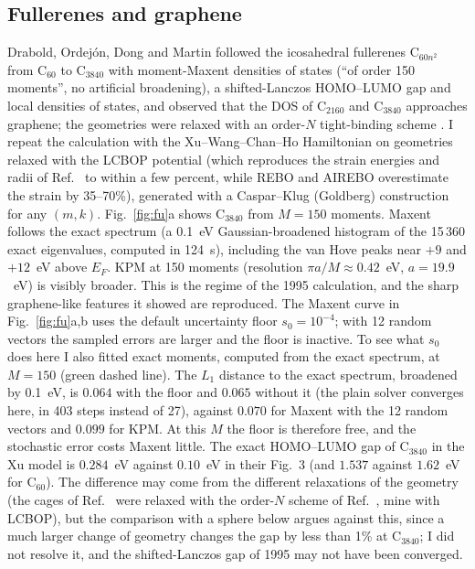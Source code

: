 \documentclass[reprint,nofootinbib,superscriptaddress,amsmath,amssymb,aps,prb,floatfix]{revtex4-2}
\begin{document}
\subsection{Fullerenes and graphene}
\label{sec:app_fu}

Drabold, Ordej\'on, Dong and Martin \cite{ssc96} followed the icosahedral fullerenes C$_{60n^2}$ from C$_{60}$ to C$_{3840}$ with moment-Maxent densities of states (``of order 150 moments'', no artificial broadening), a shifted-Lanczos HOMO--LUMO gap and local densities of states, and observed that the DOS of C$_{2160}$ and C$_{3840}$ approaches graphene; the geometries were relaxed with an order-$N$ tight-binding scheme \cite{itoh}.
I repeat the calculation with the Xu--Wang--Chan--Ho Hamiltonian \cite{xu} on geometries relaxed with the LCBOP potential \cite{lcbop} (which reproduces the strain energies and radii of Ref.~\cite{itoh} to within a few percent, while REBO and AIREBO overestimate the strain by 35--70\%), generated with a Caspar--Klug (Goldberg) construction for any $(m,k)$.
Fig.~\ref{fig:fu}a shows C$_{3840}$ from $M=150$ moments. Maxent follows the exact spectrum (a 0.1~eV Gaussian-broadened histogram of the 15\,360 exact eigenvalues, computed in 124~s), including the van Hove peaks near $+9$ and $+12$~eV above $E_F$. KPM at 150 moments (resolution $\pi a/M\approx0.42$~eV, $a=19.9$~eV) is visibly broader. This is the regime of the 1995 calculation, and the sharp graphene-like features it showed are reproduced.
The Maxent curve in Fig.~\ref{fig:fu}a,b uses the default uncertainty floor $s_0=10^{-4}$; with 12 random vectors the sampled errors are larger and the floor is inactive. To see what $s_0$ does here I also fitted exact moments, computed from the exact spectrum, at $M=150$ (green dashed line). The $L_1$ distance to the exact spectrum, broadened by 0.1~eV, is $0.064$ with the floor and $0.065$ without it (the plain solver converges here, in 403 steps instead of 27), against $0.070$ for Maxent with the 12 random vectors and $0.099$ for KPM. At this $M$ the floor is therefore free, and the stochastic error costs Maxent little.
The exact HOMO--LUMO gap of C$_{3840}$ in the Xu model is $0.284$~eV against $0.10$~eV in their Fig.~3 (and $1.537$ against $1.62$~eV for C$_{60}$). The difference may come from the different relaxations of the geometry (the cages of Ref.~\cite{ssc96} were relaxed with the order-$N$ scheme of Ref.~\cite{itoh}, mine with LCBOP), but the comparison with a sphere below argues against this, since a much larger change of geometry changes the gap by less than 1\% at C$_{3840}$; I did not resolve it, and the shifted-Lanczos gap of 1995 may not have been converged.
\end{document}
